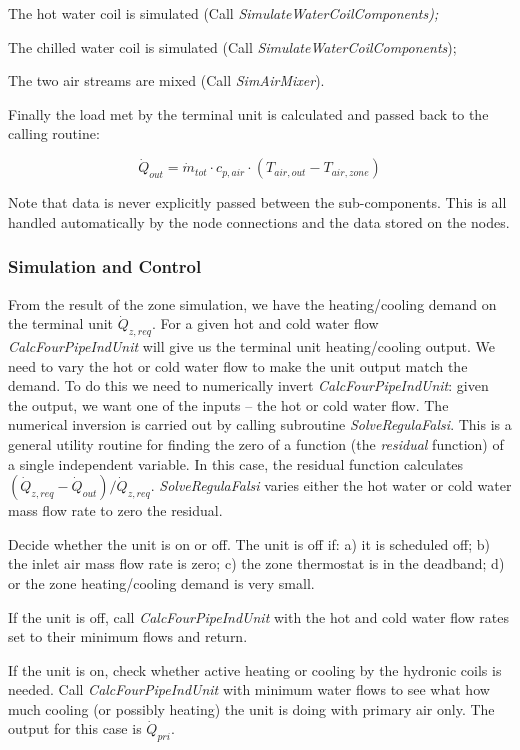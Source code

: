 The hot water coil is simulated (Call \emph{SimulateWaterCoilComponents);}

The chilled water coil is simulated (Call \emph{SimulateWaterCoilComponents});

The two air streams are mixed (Call \emph{SimAirMixer}).

Finally the load met by the terminal unit is calculated and passed back to the calling routine:

\begin{equation}
{\dot Q_{out}} = {\dot m_{tot}}\cdot {c_{p,air}}\cdot ({T_{air,out}} - {T_{air,zone}})
\end{equation}

Note that data is never explicitly passed between the sub-components. This is all handled automatically by the node connections and the data stored on the nodes.

\subsubsection{Simulation and Control}\label{simulation-and-control-1}

From the result of the zone simulation, we have the heating/cooling demand on the terminal unit \({\dot Q_{z,req}}\). For a given hot and cold water flow \emph{CalcFourPipeIndUnit} will give us the terminal unit heating/cooling output. We need to vary the hot or cold water flow to make the unit output match the demand. To do this we need to numerically invert \emph{CalcFourPipeIndUnit}: given the output, we want one of the inputs -- the hot or cold water flow. The numerical inversion is carried out by calling subroutine \emph{SolveRegulaFalsi}. This is a general utility routine for finding the zero of a function (the \emph{residual} function) of a single independent variable. In this case, the residual function calculates \(({\dot Q_{z,req}} - {\dot Q_{out}})/{\dot Q_{z,req}}\). \emph{SolveRegulaFalsi} varies either the hot water or cold water mass flow rate to zero the residual.

Decide whether the unit is on or off. The unit is off if: a) it is scheduled off; b) the inlet air mass flow rate is zero; c) the zone thermostat is in the deadband; d) or the zone heating/cooling demand is very small.

If the unit is off, call \emph{CalcFourPipeIndUnit} with the hot and cold water flow rates set to their minimum flows and return.

If the unit is on, check whether active heating or cooling by the hydronic coils is needed. Call \emph{CalcFourPipeIndUnit} with minimum water flows to see what how much cooling (or possibly heating) the unit is doing with primary air only. The output for this case is \({\dot Q_{pri}}\).

